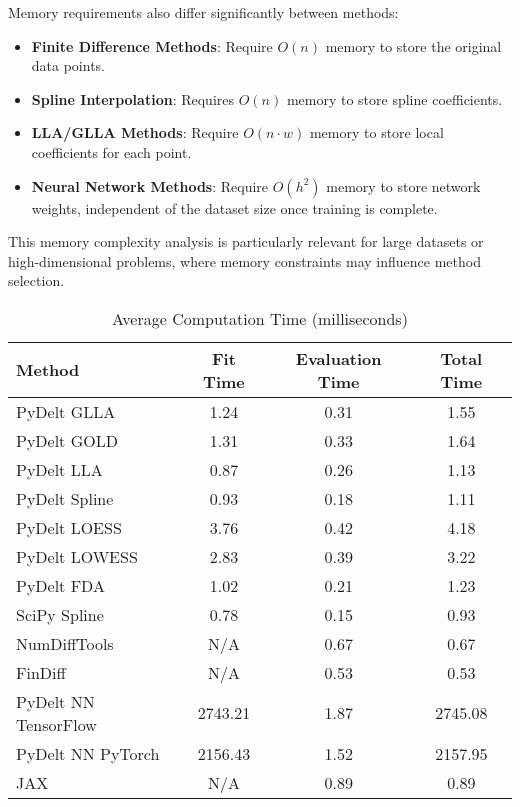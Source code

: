 \documentclass[10pt,journal,compsoc]{IEEEtran}
\begin{document}
Memory requirements also differ significantly between methods:

\begin{itemize}
    \item \textbf{Finite Difference Methods}: Require $O(n)$ memory to store the original data points.
    
    \item \textbf{Spline Interpolation}: Requires $O(n)$ memory to store spline coefficients.
    
    \item \textbf{LLA/GLLA Methods}: Require $O(n \cdot w)$ memory to store local coefficients for each point.
    
    \item \textbf{Neural Network Methods}: Require $O(h^2)$ memory to store network weights, independent of the dataset size once training is complete.
\end{itemize}

This memory complexity analysis is particularly relevant for large datasets or high-dimensional problems, where memory constraints may influence method selection.

\begin{table}[!t]
\caption{Average Computation Time (milliseconds)}
\label{tab:computation_time}
\centering
\begin{tabular}{lccc}
\toprule
\textbf{Method} & \textbf{Fit Time} & \textbf{Evaluation Time} & \textbf{Total Time} \\
\midrule
PyDelt GLLA & 1.24 & 0.31 & 1.55 \\
PyDelt GOLD & 1.31 & 0.33 & 1.64 \\
PyDelt LLA & 0.87 & 0.26 & 1.13 \\
PyDelt Spline & 0.93 & 0.18 & 1.11 \\
PyDelt LOESS & 3.76 & 0.42 & 4.18 \\
PyDelt LOWESS & 2.83 & 0.39 & 3.22 \\
PyDelt FDA & 1.02 & 0.21 & 1.23 \\
SciPy Spline & 0.78 & 0.15 & 0.93 \\
NumDiffTools & N/A & 0.67 & 0.67 \\
FinDiff & N/A & 0.53 & 0.53 \\
PyDelt NN TensorFlow & 2743.21 & 1.87 & 2745.08 \\
PyDelt NN PyTorch & 2156.43 & 1.52 & 2157.95 \\
JAX & N/A & 0.89 & 0.89 \\
\bottomrule
\end{tabular}
\end{table}
\end{document}

